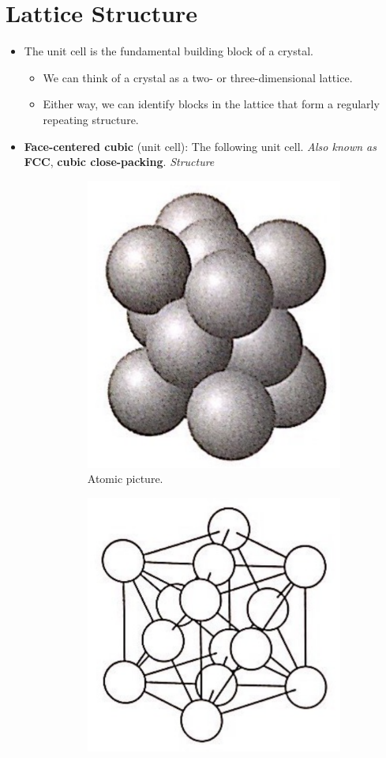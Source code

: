 \documentclass[../notes.tex]{subfiles}
\begin{document}
\section{Lattice Structure}
\begin{itemize}
    \item {}The unit cell is the fundamental building block of a crystal.
    \begin{itemize}
        \item We can think of a crystal as a two- or three-dimensional lattice.
        \item Either way, we can identify blocks in the lattice that form a regularly repeating structure.
    \end{itemize}
    \item \textbf{Face-centered cubic} (unit cell): The following unit cell. \emph{Also known as} \textbf{FCC}, \textbf{cubic close-packing}. \emph{Structure}
    \begin{figure}[H]
        \centering
        \begin{subfigure}[b]{0.2\linewidth}
            \centering
            \includegraphics[width=0.6\linewidth]{../ExtFiles/FCCunitCella.png}
            \caption{Atomic picture.}
            \label{fig:FCCunitCella}
        \end{subfigure}
        \begin{subfigure}[b]{0.2\linewidth}
            \centering
            \includegraphics[width=0.7\linewidth]{../ExtFiles/FCCunitCellb.png}

\end{subfigure}
\end{figure}
\end{itemize}
\end{document}
